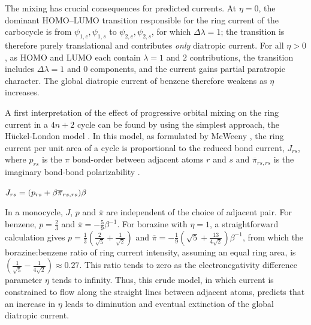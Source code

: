 The mixing has crucial consequences for predicted currents. At $\eta=0$, the dominant HOMO--LUMO transition responsible
for the ring current of the carbocycle is from {$\psi_{1,c},\psi_{1,s}$} to {$\psi_{2,c},\psi_{2,s}$}, for which $\Delta\lambda=1$; the
transition is therefore purely translational and contributes \textit{only} diatropic current.  For all $\eta>0$, as HOMO and LUMO
each contain $\lambda = 1$ and $2$ contributions, the transition includes $\Delta\lambda = 1$ and $0$ components, and the current
gains partial paratropic character.  The global diatropic current of benzene therefore weakens as $\eta$ increases.

A first interpretation of the effect of progressive orbital mixing on the ring current in a $4n+2$ cycle can be found by using
the simplest approach, the H\"uckel-London model \cite{r06}.  In this model, as formulated by McWeeny \cite{r23}, the ring current
per unit area of a cycle is proportional to the reduced bond current, $J_{rs}$, where $p_{rs}$ is the $\pi$ bond-order between
adjacent atoms $r$ and $s$ and $\overline{\pi}_{rs,rs}$ is the imaginary bond-bond polarizability \cite{r01}. 

\begin{math}
\\
J_{rs}=(p_{rs}+\beta\overline{\pi}_{rs,rs})\beta
\\
\end{math}

In a monocycle, $J$, $p$ and $\overline{\pi}$ are independent of the choice of adjacent pair. For benzene, $p=\frac{2}{3}$ and
$\overline{\pi}=-\frac{5}{9}\beta^{-1}$. For borazine with $\eta=1$, a straightforward calculation gives $p=\frac{1}{3}(\frac{2}{\sqrt{5}}+
\frac{1}{\sqrt{2}})$ and $\overline{\pi}=-\frac{1}{9}(\sqrt{5}+\frac{13}{4\sqrt{2}})\beta^{-1}$, from which the borazine:benzene
ratio of ring current intensity, assuming an equal ring area, is $(\frac{1}{\sqrt{5}}-\frac{1}{4\sqrt{2}})\approx 0.27$. This ratio
tends to zero as the electronegativity difference parameter $\eta$ tends to infinity. Thus, this crude model, in which current
is constrained to flow along the straight lines between adjacent atoms, predicts that an increase in $\eta$ leads to diminution
and eventual extinction of the global diatropic current. 

